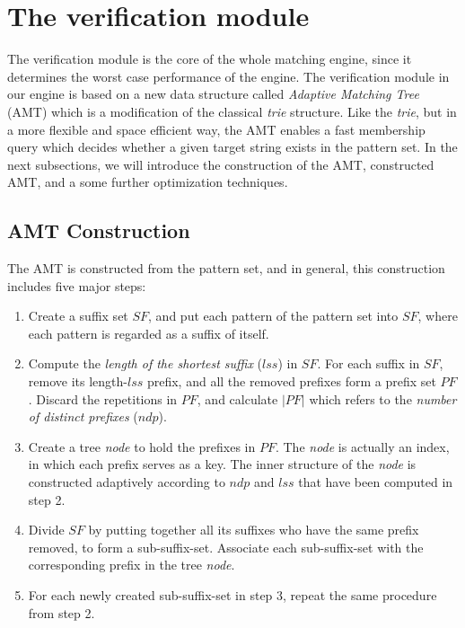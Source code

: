 \documentclass{article}
\begin{document}

\section{The verification module}
\label{sec:verification}

The verification module is the core of the whole matching engine,
since it determines the worst case performance of the engine. The
verification module in our engine is based on a new data structure
called \emph{Adaptive Matching Tree} (AMT) which is a modification of
the classical \emph{trie} structure. Like the \emph{trie}, but in a
more flexible and space efficient way, the AMT enables a fast
membership query which decides whether a given target string exists in
the pattern set. In the next subsections, we will introduce the
construction of the AMT, constructed AMT, and a some further
optimization techniques.

\subsection{AMT Construction}
\label{subsec:amt}

The AMT is constructed from the pattern set, and in general, this
construction includes five major steps:

\begin{enumerate}
\item Create a suffix set $SF$, and put each pattern of the pattern
  set into $SF$, where each pattern is regarded as a suffix of itself.
\item Compute the \emph{length of the shortest suffix} ($lss$) in
  $SF$. For each suffix in $SF$, remove its length-$lss$ prefix, and
  all the removed prefixes form a prefix set $PF$. Discard the
  repetitions in $PF$, and calculate $|PF|$ which refers to the
  \emph{number of distinct prefixes} ($ndp$).
\item Create a tree \emph{node} to hold the prefixes in $PF$. The
  \emph{node} is actually an index, in which each prefix serves as a
  key. The inner structure of the \emph{node} is constructed
  adaptively according to $ndp$ and $lss$ that have been computed in
  step 2.
\item Divide $SF$ by putting together all its suffixes who have the
  same prefix removed, to form a sub-suffix-set. Associate each
  sub-suffix-set with the corresponding prefix in the tree \emph{node}.
\item For each newly created sub-suffix-set in step 3, repeat the same
  procedure from step 2.
\end{enumerate}
\end{document}
